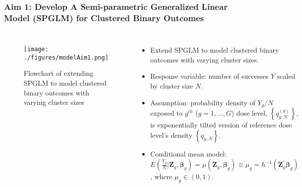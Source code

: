 \documentclass[hyperref={bookmarks=false},aspectratio=169]{beamer}
\begin{document}
\begin{frame}
\frametitle{Aim 1: Develop A Semi-parametric Generalized Linear Model (SPGLM) for Clustered Binary Outcomes}

\begin{columns}


\begin{figure}
    \centering
    \texttt{[image: ./figures/modelAim1.png]}
    \caption{Flowchart of extending SPGLM to model clustered binary outcomes with varying cluster sizes}
    \label{fig:Aim11}
\end{figure}

\begin{itemize}
    \item Extend SPGLM to model clustered binary outcomes with varying cluster sizes.
    \item Response variable: number of successes $Y$ scaled by cluster size $N$.
    \item \alert{Assumption}: probability density of $Y_g/N$ exposed to $g^{th}$ ($g = 1, \dots, G$) dose level, $\left\lbrace q_{y,N}^{(g)} \right\rbrace$, is exponentially tilted version of reference dose level's density $\left\lbrace q_{y,N} \right\rbrace$.
    \item \alert{Conditional mean model}: \newline
    $E\left( \frac{Y_g}{N} | \boldsymbol{Z}_g, \boldsymbol{\beta}_g \right) = \mu(\boldsymbol{Z}_g, \boldsymbol{\beta}_g)  \equiv \mu_g = h^{-1} \left( \boldsymbol{Z}_g^{'} \boldsymbol{\beta}_g \right)$, where $\mu_g \in (0, 1)$.
\end{itemize}

\end{columns}
\end{frame}
\end{document}
